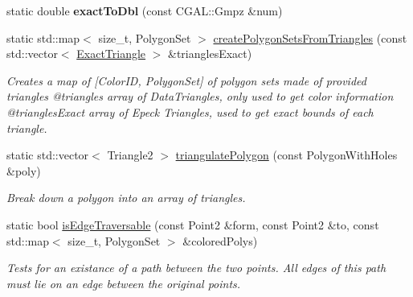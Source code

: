 \begin{DoxyCompactItemize}
\mbox{\label{classpepr3d_1_1_triangle_detail_a0ca54d4a96e232c5ed34095e2133c99e}} 
static double {\bfseries exact\+To\+Dbl} (const C\+G\+A\+L\+::\+Gmpz \&num)
\item 
\mbox{\label{classpepr3d_1_1_triangle_detail_ad8daeb9c2bdb4d033a553ec4fa35e5a0}} 
static std\+::map$<$ size\+\_\+t, Polygon\+Set $>$ \mbox{\hyperlink{classpepr3d_1_1_triangle_detail_ad8daeb9c2bdb4d033a553ec4fa35e5a0}{create\+Polygon\+Sets\+From\+Triangles}} (const std\+::vector$<$ \mbox{\hyperlink{structpepr3d_1_1_triangle_detail_1_1_exact_triangle}{Exact\+Triangle}} $>$ \&triangles\+Exact)
\begin{DoxyCompactList}\small\item\em Creates a map of \mbox{[}Color\+ID, Polygon\+Set\mbox{]} of polygon sets made of provided triangles @triangles array of Data\+Triangles, only used to get color information @triangles\+Exact array of Epeck Triangles, used to get exact bounds of each triangle. \end{DoxyCompactList}\item 
static std\+::vector$<$ Triangle2 $>$ \mbox{\hyperlink{classpepr3d_1_1_triangle_detail_a8409d1df8edf713beaf1743c0399c6d4}{triangulate\+Polygon}} (const Polygon\+With\+Holes \&poly)
\begin{DoxyCompactList}\small\item\em Break down a polygon into an array of triangles. \end{DoxyCompactList}\item 
static bool \mbox{\hyperlink{classpepr3d_1_1_triangle_detail_a967a585a18caab0270893b3e757030d4}{is\+Edge\+Traversable}} (const Point2 \&form, const Point2 \&to, const std\+::map$<$ size\+\_\+t, Polygon\+Set $>$ \&colored\+Polys)
\begin{DoxyCompactList}\small\item\em Tests for an existance of a path between the two points. All edges of this path must lie on an edge between the original points. \end{DoxyCompactList}\end{DoxyCompactItemize}
